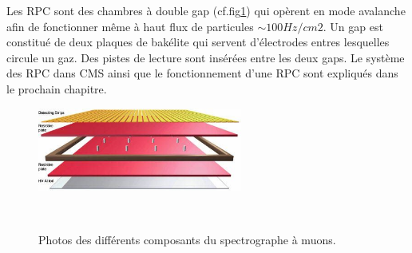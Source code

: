 \begin{itemize}[label=$\bullet$]
	Les RPC sont des chambres à double gap (cf.fig\ref{RPC2}) qui opèrent en mode avalanche afin de fonctionner même à haut flux de particules $\sim 100 Hz/cm2$. Un gap est constitué de deux plaques de bakélite qui servent d'électrodes entres lesquelles circule un gaz. Des pistes de lecture sont insérées entre les deux gaps. Le système des RPC dans CMS ainsi que le fonctionnement d'une RPC sont expliqués dans le prochain chapitre.
	  \begin{figure}[ht!]
		\centering
		\includegraphics[width=0.60\textwidth]{CMS/RPC2.jpg}
		\label{RPC2}
	\end{figure}
	
	
\end{itemize}
    \begin{figure}[ht!]
	\centering
	\\
	\caption{Photos des différents composants du spectrographe à muons.}
\end{figure}

